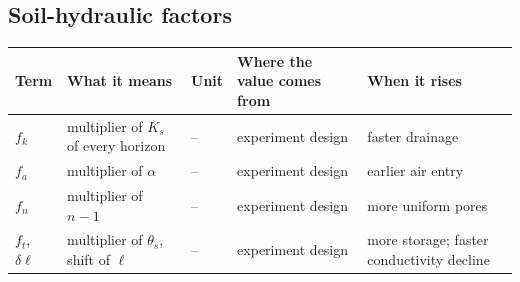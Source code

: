 \subsection*{Soil-hydraulic factors}
{\small\begin{longtable}{>{\raggedright\arraybackslash}p{}>{\raggedright\arraybackslash}p{}>{\raggedright\arraybackslash}p{}>{\raggedright\arraybackslash}p{}>{\raggedright\arraybackslash}p{}}\toprule Term & What it means & Unit & Where the value comes from & When it rises\\\midrule\endhead
$f_k$ & multiplier of $K_s$ of every horizon & -- & experiment design & faster drainage\\
$f_a$ & multiplier of $\alpha$ & -- & experiment design & earlier air entry\\
$f_n$ & multiplier of $n-1$ & -- & experiment design & more uniform pores\\
$f_t$, $\delta\ell$ & multiplier of $\theta_s$, shift of $\ell$ & -- & experiment design & more storage; faster conductivity decline\\
\bottomrule\end{longtable}}
